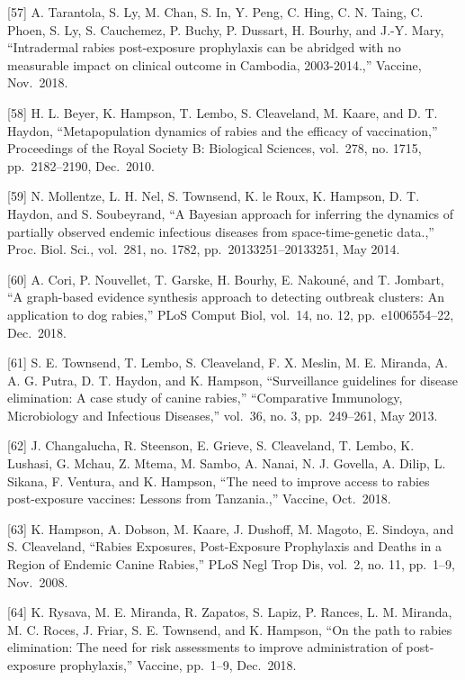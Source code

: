 \documentclass[
  oneside]{book}
\begin{document}
{[}57{]} A. Tarantola, S. Ly, M. Chan, S. In, Y. Peng, C. Hing, C. N. Taing, C. Phoen, S. Ly, S. Cauchemez, P. Buchy, P. Dussart, H. Bourhy, and J.-Y. Mary, ``Intradermal rabies post-exposure prophylaxis can be abridged with no measurable impact on clinical outcome in Cambodia, 2003-2014.,'' Vaccine, Nov.~2018.

{[}58{]} H. L. Beyer, K. Hampson, T. Lembo, S. Cleaveland, M. Kaare, and D. T. Haydon, ``Metapopulation dynamics of rabies and the efficacy of vaccination,'' Proceedings of the Royal Society B: Biological Sciences, vol.~278, no. 1715, pp.~2182--2190, Dec.~2010.

{[}59{]} N. Mollentze, L. H. Nel, S. Townsend, K. le Roux, K. Hampson, D. T. Haydon, and S. Soubeyrand, ``A Bayesian approach for inferring the dynamics of partially observed endemic infectious diseases from space-time-genetic data.,'' Proc. Biol. Sci., vol.~281, no. 1782, pp.~20133251--20133251, May 2014.

{[}60{]} A. Cori, P. Nouvellet, T. Garske, H. Bourhy, E. Nakouné, and T. Jombart, ``A graph-based evidence synthesis approach to detecting outbreak clusters: An application to dog rabies,'' PLoS Comput Biol, vol.~14, no. 12, pp.~e1006554--22, Dec.~2018.

{[}61{]} S. E. Townsend, T. Lembo, S. Cleaveland, F. X. Meslin, M. E. Miranda, A. A. G. Putra, D. T. Haydon, and K. Hampson, ``Surveillance guidelines for disease elimination: A case study of canine rabies,'' ``Comparative Immunology, Microbiology and Infectious Diseases,'' vol.~36, no. 3, pp.~249--261, May 2013.

{[}62{]} J. Changalucha, R. Steenson, E. Grieve, S. Cleaveland, T. Lembo, K. Lushasi, G. Mchau, Z. Mtema, M. Sambo, A. Nanai, N. J. Govella, A. Dilip, L. Sikana, F. Ventura, and K. Hampson, ``The need to improve access to rabies post-exposure vaccines: Lessons from Tanzania.,'' Vaccine, Oct.~2018.

{[}63{]} K. Hampson, A. Dobson, M. Kaare, J. Dushoff, M. Magoto, E. Sindoya, and S. Cleaveland, ``Rabies Exposures, Post-Exposure Prophylaxis and Deaths in a Region of Endemic Canine Rabies,'' PLoS Negl Trop Dis, vol.~2, no. 11, pp.~1--9, Nov.~2008.

{[}64{]} K. Rysava, M. E. Miranda, R. Zapatos, S. Lapiz, P. Rances, L. M. Miranda, M. C. Roces, J. Friar, S. E. Townsend, and K. Hampson, ``On the path to rabies elimination: The need for risk assessments to improve administration of post-exposure prophylaxis,'' Vaccine, pp.~1--9, Dec.~2018.
\end{document}
